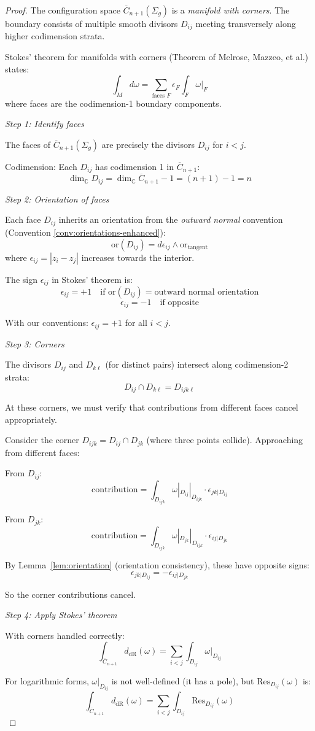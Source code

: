 \begin{proof}
The configuration space $\overline{C}_{n+1}(\Sigma_g)$ is a \emph{manifold with corners}. The boundary consists of multiple smooth divisors $D_{ij}$ meeting transversely along higher codimension strata.

Stokes' theorem for manifolds with corners (Theorem of Melrose, Mazzeo, et al.) states:
\[\int_M d\omega = \sum_{\text{faces } F} \epsilon_F \int_F \omega|_F\]
where faces are the codimension-1 boundary components.

\emph{Step 1: Identify faces}

The faces of $\overline{C}_{n+1}(\Sigma_g)$ are precisely the divisors $D_{ij}$ for $i < j$.

Codimension: Each $D_{ij}$ has codimension 1 in $\overline{C}_{n+1}$:
\[\dim_{\mathbb{C}} D_{ij} = \dim_{\mathbb{C}} \overline{C}_{n+1} - 1 = (n+1) - 1 = n\]

\emph{Step 2: Orientation of faces}

Each face $D_{ij}$ inherits an orientation from the \emph{outward normal} convention (Convention \ref{conv:orientations-enhanced}):
\[\text{or}(D_{ij}) = d\epsilon_{ij} \wedge \text{or}_{\text{tangent}}\]
where $\epsilon_{ij} = |z_i - z_j|$ increases towards the interior.

The sign $\epsilon_{ij}$ in Stokes' theorem is:
\[\epsilon_{ij} = +1 \quad \text{if } \text{or}(D_{ij}) = \text{outward normal orientation}\]
\[\epsilon_{ij} = -1 \quad \text{if opposite}\]

With our conventions: $\epsilon_{ij} = +1$ for all $i < j$.

\emph{Step 3: Corners}

The divisors $D_{ij}$ and $D_{k\ell}$ (for distinct pairs) intersect along codimension-2 strata:
\[D_{ij} \cap D_{k\ell} = D_{ijk\ell}\]

At these corners, we must verify that contributions from different faces cancel appropriately.

Consider the corner $D_{ijk} = D_{ij} \cap D_{jk}$ (where three points collide). Approaching from different faces:

From $D_{ij}$:
\[\text{contribution} = \int_{D_{ijk}} \omega|_{D_{ij}}|_{D_{ijk}} \cdot \epsilon_{jk|D_{ij}}\]

From $D_{jk}$:
\[\text{contribution} = \int_{D_{ijk}} \omega|_{D_{jk}}|_{D_{ijk}} \cdot \epsilon_{ij|D_{jk}}\]

By Lemma~\ref{lem:orientation} (orientation consistency), these have opposite signs:
\[\epsilon_{jk|D_{ij}} = -\epsilon_{ij|D_{jk}}\]

So the corner contributions cancel.

\emph{Step 4: Apply Stokes' theorem}

With corners handled correctly:
\[\int_{\overline{C}_{n+1}} d_{\text{dR}}(\omega) = \sum_{i<j} \int_{D_{ij}} \omega|_{D_{ij}}\]

For logarithmic forms, $\omega|_{D_{ij}}$ is not well-defined (it has a pole), but $\text{Res}_{D_{ij}}(\omega)$ is:
\[\int_{\overline{C}_{n+1}} d_{\text{dR}}(\omega) = \sum_{i<j} \int_{D_{ij}} \text{Res}_{D_{ij}}(\omega)\]
\end{proof}

